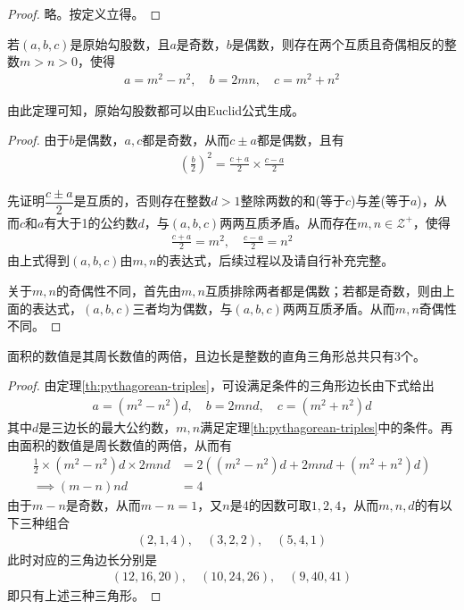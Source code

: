 \begin{proof}
  略。按定义立得。
\end{proof}

\begin{theorem}\label{th:pythagorean-triples}
  若$(a,b,c)$是原始勾股数，且$a$是奇数，$b$是偶数，则存在两个互质且奇偶相反的整数$m>n>0$，使得
  \begin{align*}
    a=m^2-n^2,\quad b=2mn,\quad c=m^2+n^2
  \end{align*}
\end{theorem}

由此定理可知，原始勾股数都可以由Euclid公式生成。

\begin{proof}
  由于$b$是偶数，$a,c$都是奇数，从而$c\pm a$都是偶数，且有
  \begin{align*}
    \left(\frac b2\right)^2 = \frac{c+a}2\times\frac{c-a}2
  \end{align*}
  
  先证明$\dfrac{c\pm a}2$是互质的，否则存在整数$d>1$整除两数的和(等于$c$)与差(等于$a$)，从而$c$和$a$有大于1的公约数$d$，与$(a,b,c)$两两互质矛盾。从而存在$m,n\in\mathcal{Z}^+$，使得
  \begin{align*}
    \frac{c+a}2=m^2,\quad \frac{c-a}2=n^2
  \end{align*}
  由上式得到$(a,b,c)$由$m,n$的表达式，后续过程以及请自行补充完整。

  关于$m,n$的奇偶性不同，首先由$m,n$互质排除两者都是偶数；若都是奇数，则由上面的表达式，$(a,b,c)$三者均为偶数，与$(a,b,c)$两两互质矛盾。从而$m,n$奇偶性不同。
\end{proof}


\begin{example}
  面积的数值是其周长数值的两倍，且边长是整数的直角三角形总共只有3个。
\end{example}

\begin{proof}
  由定理\ref{th:pythagorean-triples}，可设满足条件的三角形边长由下式给出
  \begin{align*}
    a = (m^2-n^2)d,\quad b=2mnd,\quad c=(m^2+n^2)d
  \end{align*}
  其中$d$是三边长的最大公约数，$m,n$满足定理\ref{th:pythagorean-triples}中的条件。再由面积的数值是周长数值的两倍，从而有
  \begin{align*}
    \frac12 \times (m^2-n^2)d\times 2mnd & = 2\left( (m^2-n^2)d + 2mnd + (m^2+n^2)d \right)\\
    \implies (m-n)nd & = 4
  \end{align*}
  由于$m-n$是奇数，从而$m-n=1$，又$n$是4的因数可取$1,2,4$，从而$m,n,d$的有以下三种组合
  \begin{align*}
    (2,1,4),\quad (3,2,2),\quad (5,4,1)
  \end{align*}
  此时对应的三角边长分别是
  \begin{align*}
    (12,16,20),\quad (10,24,26),\quad (9,40,41)
  \end{align*}
  即只有上述三种三角形。
\end{proof}

